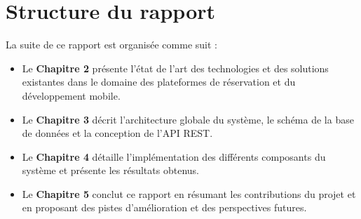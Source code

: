 \section{Structure du rapport}

La suite de ce rapport est organisée comme suit :

\begin{itemize}
    \item Le \textbf{Chapitre 2} présente l'état de l'art des technologies et des solutions existantes dans le domaine des plateformes de réservation et du développement mobile.
    \item Le \textbf{Chapitre 3} décrit l'architecture globale du système, le schéma de la base de données et la conception de l'API REST.
    \item Le \textbf{Chapitre 4} détaille l'implémentation des différents composants du système et présente les résultats obtenus.
    \item Le \textbf{Chapitre 5} conclut ce rapport en résumant les contributions du projet et en proposant des pistes d'amélioration et des perspectives futures.
\end{itemize}